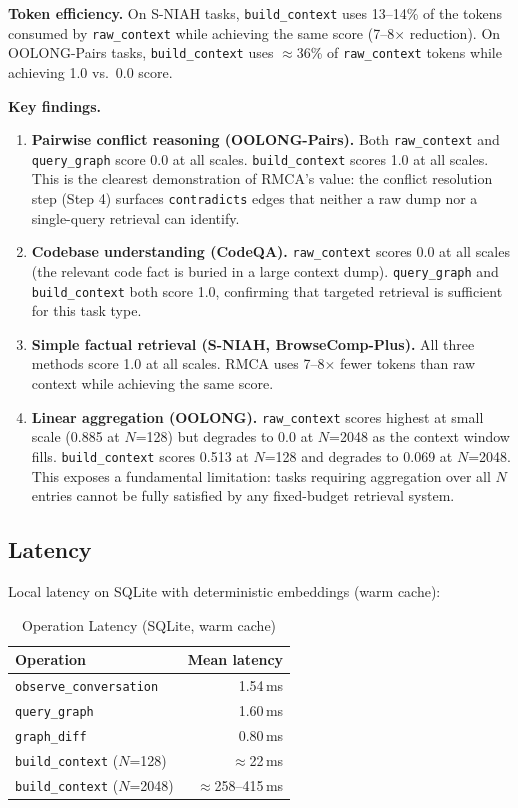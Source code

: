 \documentclass[conference]{IEEEtran}
\begin{document}
\textbf{Token efficiency.} On S-NIAH tasks, \texttt{build\_context} uses 13--14\% of the
tokens consumed by \texttt{raw\_context} while achieving the same score (7--8$\times$
reduction). On OOLONG-Pairs tasks, \texttt{build\_context} uses $\approx$36\% of
\texttt{raw\_context} tokens while achieving 1.0 vs.\ 0.0 score.

\textbf{Key findings.}
\begin{enumerate}
\item \textbf{Pairwise conflict reasoning (OOLONG-Pairs).} Both \texttt{raw\_context} and
\texttt{query\_graph} score 0.0 at all scales. \texttt{build\_context} scores 1.0 at all
scales. This is the clearest demonstration of RMCA's value: the conflict resolution step
(Step 4) surfaces \texttt{contradicts} edges that neither a raw dump nor a single-query
retrieval can identify.
\item \textbf{Codebase understanding (CodeQA).} \texttt{raw\_context} scores 0.0 at all
scales (the relevant code fact is buried in a large context dump). \texttt{query\_graph}
and \texttt{build\_context} both score 1.0, confirming that targeted retrieval is sufficient
for this task type.
\item \textbf{Simple factual retrieval (S-NIAH, BrowseComp-Plus).} All three methods score
1.0 at all scales. RMCA uses 7--8$\times$ fewer tokens than raw context while achieving the
same score.
\item \textbf{Linear aggregation (OOLONG).} \texttt{raw\_context} scores highest at small
scale (0.885 at $N$=128) but degrades to 0.0 at $N$=2048 as the context window fills.
\texttt{build\_context} scores 0.513 at $N$=128 and degrades to 0.069 at $N$=2048. This
exposes a fundamental limitation: tasks requiring aggregation over all $N$ entries cannot
be fully satisfied by any fixed-budget retrieval system.
\end{enumerate}

\subsection{Latency}

Local latency on SQLite with deterministic embeddings (warm cache):

\begin{table}[htbp]
\caption{Operation Latency (SQLite, warm cache)}
\label{tab:latency}
\centering
\begin{tabular}{lr}
\toprule
\textbf{Operation} & \textbf{Mean latency} \\
\midrule
\texttt{observe\_conversation} & 1.54\,ms \\
\texttt{query\_graph}          & 1.60\,ms \\
\texttt{graph\_diff}           & 0.80\,ms \\
\texttt{build\_context} ($N$=128)  & $\approx$22\,ms \\
\texttt{build\_context} ($N$=2048) & $\approx$258--415\,ms \\
\bottomrule
\end{tabular}
\end{table}
\end{document}
